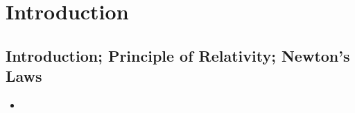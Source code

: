 \documentclass[../notes.tex]{subfiles}
\begin{document}
\chapter{Introduction}
\section{Introduction; Principle of Relativity; Newton's Laws}
\begin{itemize}
    \item {}
\end{itemize}
\end{document}
